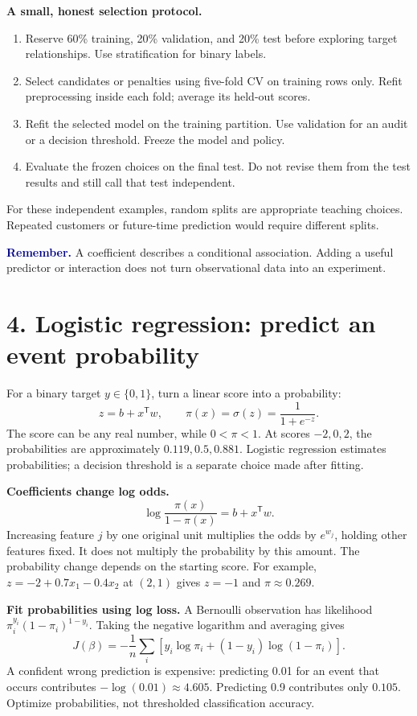 \documentclass[11pt,a4paper]{article}
\newcommand{\T}{^{\mathsf T}}
\newcommand{\idea}[1]{\textcolor{navy}{\textbf{Remember.}} #1}
\begin{document}
\textbf{A small, honest selection protocol.}
\begin{enumerate}
\item Reserve 60\% training, 20\% validation, and 20\% test before exploring
      target relationships. Use stratification for binary labels.
\item Select candidates or penalties using five-fold CV on training rows only.
      Refit preprocessing inside each fold; average its held-out scores.
\item Refit the selected model on the training partition. Use validation for
      an audit or a decision threshold. Freeze the model and policy.
\item Evaluate the frozen choices on the final test. Do not revise them from
      the test results and still call that test independent.
\end{enumerate}
For these independent examples, random splits are appropriate teaching choices.
Repeated customers or future-time prediction would require different splits.

\idea{A coefficient describes a conditional association. Adding a useful
predictor or interaction does not turn observational data into an experiment.}

\newpage
\section*{4. Logistic regression: predict an event probability}
For a binary target $y\in\{0,1\}$, turn a linear score into a probability:
\[
z=b+x\T w,\qquad
\boxed{\pi(x)=\sigma(z)=\frac1{1+e^{-z}}.}
\]
The score can be any real number, while $0<\pi<1$. At scores $-2,0,2$,
the probabilities are approximately $0.119,0.5,0.881$.
Logistic regression estimates probabilities; a decision threshold is a separate
choice made after fitting.

\textbf{Coefficients change log odds.}
\[
\log\frac{\pi(x)}{1-\pi(x)}=b+x\T w.
\]
Increasing feature $j$ by one original unit multiplies the odds by $e^{w_j}$,
holding other features fixed. It does not multiply the probability by this
amount. The probability change depends on the starting score.
For example, $z=-2+0.7x_1-0.4x_2$ at $(2,1)$ gives $z=-1$ and
$\pi\approx0.269$.

\textbf{Fit probabilities using log loss.}
A Bernoulli observation has likelihood $\pi_i^{y_i}(1-\pi_i)^{1-y_i}$.
Taking the negative logarithm and averaging gives
\[
J(\beta)=-\frac1n\sum_i\left[y_i\log\pi_i+(1-y_i)\log(1-\pi_i)\right].
\]
A confident wrong prediction is expensive: predicting 0.01 for an event that
occurs contributes $-\log(0.01)\approx4.605$. Predicting 0.9 contributes only
$0.105$. Optimize probabilities, not thresholded classification accuracy.
\end{document}

